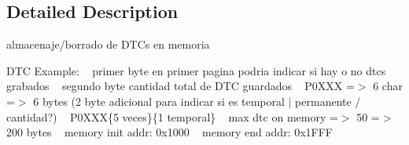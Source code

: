 \subsection{Detailed Description}
almacenaje/borrado de D\+TC\textquotesingle{}s en memoria 

D\+TC Example\+: ~\newline
primer byte en primer pagina podria indicar si hay o no dtcs grabados ~\newline
segundo byte cantidad total de D\+TC guardados ~\newline
P0\+X\+XX =$>$ 6 char =$>$ 6 bytes (2 byte adicional para indicar si es temporal $\vert$ permanente / cantidad?) ~\newline
P0\+X\+XX\{5 veces\}\{1 temporal\} ~\newline
max dtc on memory =$>$ 50 =$>$ 200 bytes ~\newline
memory init addr\+: 0x1000 ~\newline
memory end addr\+: 0x1\+F\+FF ~\newline
